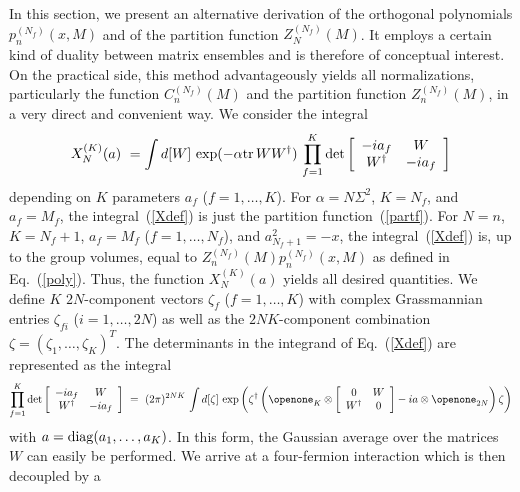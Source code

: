 In this section, we present an alternative derivation of the
orthogonal polynomials $p_n^{(N_f)}(x,M)$ and of the partition
function $Z_N^{(N_f)}(M)$. It employs a certain kind of duality
between matrix ensembles and is therefore of conceptual interest. On
the practical side, this method advantageously yields all
normalizations, particularly the function $C_n^{(N_f)}(M)$ and the
partition function $Z_n^{(N_f)}(M)$, in a very direct and convenient
way. We consider the integral
\begin{equation}
X_N^{(K)}(a) \ = \int d[W] \, \exp(-\alpha{{\rm tr}\,} WW^\dagger) \,
\prod_{f=1}^K \det\left[
            \begin{array}{cc} -ia_f & W \\ 
                          W^\dagger & -ia_f 
            \end{array} \right]
\label{Xdef}
\end{equation}
depending on $K$ parameters $a_f$ ($f=1,\ldots,K$). For
$\alpha=N\Sigma^2$, $K=N_f$, and $a_f=M_f$, the integral~(\ref{Xdef})
is just the partition function~(\ref{partf}). For $N=n$, $K=N_f+1$,
$a_f=M_f$ ($f=1,\ldots,N_f$), and $a_{N_f+1}^2=-x$, the
integral~(\ref{Xdef}) is, up to the group volumes, equal to
$Z_n^{(N_f)}(M)p_n^{(N_f)}(x,M)$ as defined in Eq.~(\ref{poly}). Thus,
the function $X_N^{(K)}(a)$ yields all desired quantities.  We define
$K$ $2N$-component vectors $\zeta_f$ ($f=1,\ldots,K$) with complex
Grassmannian entries $\zeta_{fi}$ ($i=1,\ldots,2N$) as well as the
$2NK$-component combination $\zeta=(\zeta_1,\ldots,\zeta_K)^T$.  The
determinants in the integrand of Eq.~(\ref{Xdef}) are represented as
the integral
\begin{equation}
\prod_{f=1}^K \det\left[\begin{array}{cc} -ia_f      & W \\ 
                                           W^\dagger & -ia_f 
                        \end{array}\right] \ = \ 
(2\pi)^{2NK} \, \int d[\zeta] \, \exp\left(\zeta^\dagger
  \left(\openone_K\otimes
   \left[\begin{array}{cc} 0         & W \\ 
                           W^\dagger & 0
    \end{array}\right] - ia\otimes \openone_{2N}\right)\zeta\right)
\label{fermint}
\end{equation}
with $a={\rm diag}(a_1,\ldots,a_K)$. In this form, the Gaussian
average over the matrices $W$ can easily be performed. We arrive at a
four-fermion interaction which is then decoupled by a
